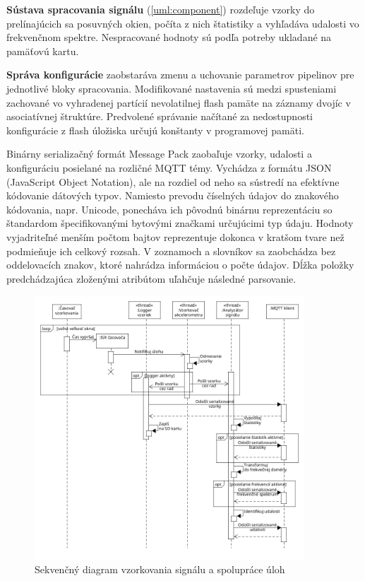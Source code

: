 \textbf{Sústava spracovania signálu} (\ref{uml:component}) rozdeľuje vzorky do prelínajúcich sa posuvných okien, počíta z nich štatistiky
a vyhľadáva udalosti vo frekvenčnom spektre. Nespracované hodnoty sú podľa potreby ukladané na pamäťovú kartu.

\textbf{Správa konfigurácie} zaobstaráva zmenu a uchovanie parametrov pipelinov pre jednotlivé bloky spracovania.
Modifikované nastavenia sú
medzi spusteniami zachované vo vyhradenej partícií nevolatilnej flash pamäte na záznamy dvojíc v asociatívnej štruktúre. Predvolené
správanie načítané za nedostupnosti konfigurácie z flash úložiska určujú konštanty v programovej pamäti.

Binárny serializačný formát Message Pack zaobaľuje vzorky, udalosti a konfiguráciu posielané na rozličné MQTT témy. Vychádza z
formátu JSON (JavaScript Object Notation), ale na rozdiel od neho sa sústredí na efektívne kódovanie dátových typov. Namiesto prevodu
číselných údajov do znakového kódovania, napr. Unicode, ponecháva ich pôvodnú binárnu reprezentáciu so štandardom špecifikovanými bytovými
značkami určujúcimi typ údaju. Hodnoty vyjadriteľné menším počtom bajtov reprezentuje dokonca v kratšom tvare než
podmieňuje ich celkový rozsah. V zoznamoch a slovníkov sa zaobchádza bez oddelovacích znakov, ktoré nahrádza
informáciou o počte údajov. Dĺžka položky predchádzajúca zloženými atribútom uľahčuje následné parsovanie.

\begin{figure}[h]
	\centering
	\includegraphics[width=0.9\textwidth]{figures/design/tasks.png}
	\caption{Sekvenčný diagram vzorkovania signálu a spolupráce úloh}
	\label{uml:sequence}
\end{figure}

